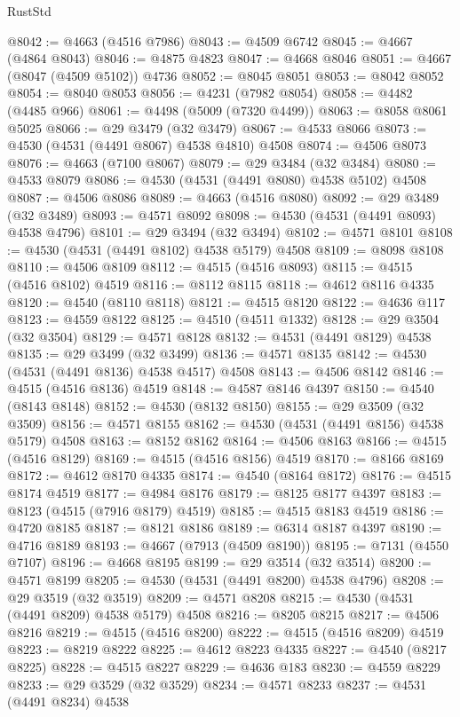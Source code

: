 \begin{lexlean}{RustStd}
\begin{coremodule}
{\begin{coremodule}
{{{{{{{{{{{{{{{{{{{{{{{{{{{{{{{{{{{{{{{{{{{{{{{{{{{{{{{@8042 := @4663 (@4516 @7986)
@8043 := @4509 @6742
@8045 := @4667 (@4864 @8043)
@8046 := @4875 @4823
@8047 := @4668 @8046
@8051 := @4667 (@8047 (@4509 @5102)) @4736
@8052 := @8045 @8051
@8053 := @8042 @8052
@8054 := @8040 @8053
@8056 := @4231 (@7982 @8054)
@8058 := @4482 (@4485 @966)
@8061 := @4498 (@5009 (@7320 @4499))
@8063 := @8058 @8061 @5025
@8066 := @29 @3479 (@32 @3479)
@8067 := @4533 @8066
@8073 := @4530 (@4531 (@4491 @8067) @4538 @4810) @4508
@8074 := @4506 @8073
@8076 := @4663 (@7100 @8067)
@8079 := @29 @3484 (@32 @3484)
@8080 := @4533 @8079
@8086 := @4530 (@4531 (@4491 @8080) @4538 @5102) @4508
@8087 := @4506 @8086
@8089 := @4663 (@4516 @8080)
@8092 := @29 @3489 (@32 @3489)
@8093 := @4571 @8092
@8098 := @4530 (@4531 (@4491 @8093) @4538 @4796)
@8101 := @29 @3494 (@32 @3494)
@8102 := @4571 @8101
@8108 := @4530 (@4531 (@4491 @8102) @4538 @5179) @4508
@8109 := @8098 @8108
@8110 := @4506 @8109
@8112 := @4515 (@4516 @8093)
@8115 := @4515 (@4516 @8102) @4519
@8116 := @8112 @8115
@8118 := @4612 @8116 @4335
@8120 := @4540 (@8110 @8118)
@8121 := @4515 @8120
@8122 := @4636 @117
@8123 := @4559 @8122
@8125 := @4510 (@4511 @1332)
@8128 := @29 @3504 (@32 @3504)
@8129 := @4571 @8128
@8132 := @4531 (@4491 @8129) @4538
@8135 := @29 @3499 (@32 @3499)
@8136 := @4571 @8135
@8142 := @4530 (@4531 (@4491 @8136) @4538 @4517) @4508
@8143 := @4506 @8142
@8146 := @4515 (@4516 @8136) @4519
@8148 := @4587 @8146 @4397
@8150 := @4540 (@8143 @8148)
@8152 := @4530 (@8132 @8150)
@8155 := @29 @3509 (@32 @3509)
@8156 := @4571 @8155
@8162 := @4530 (@4531 (@4491 @8156) @4538 @5179) @4508
@8163 := @8152 @8162
@8164 := @4506 @8163
@8166 := @4515 (@4516 @8129)
@8169 := @4515 (@4516 @8156) @4519
@8170 := @8166 @8169
@8172 := @4612 @8170 @4335
@8174 := @4540 (@8164 @8172)
@8176 := @4515 @8174 @4519
@8177 := @4984 @8176
@8179 := @8125 @8177 @4397
@8183 := @8123 (@4515 (@7916 @8179) @4519)
@8185 := @4515 @8183 @4519
@8186 := @4720 @8185
@8187 := @8121 @8186
@8189 := @6314 @8187 @4397
@8190 := @4716 @8189
@8193 := @4667 (@7913 (@4509 @8190))
@8195 := @7131 (@4550 @7107)
@8196 := @4668 @8195
@8199 := @29 @3514 (@32 @3514)
@8200 := @4571 @8199
@8205 := @4530 (@4531 (@4491 @8200) @4538 @4796)
@8208 := @29 @3519 (@32 @3519)
@8209 := @4571 @8208
@8215 := @4530 (@4531 (@4491 @8209) @4538 @5179) @4508
@8216 := @8205 @8215
@8217 := @4506 @8216
@8219 := @4515 (@4516 @8200)
@8222 := @4515 (@4516 @8209) @4519
@8223 := @8219 @8222
@8225 := @4612 @8223 @4335
@8227 := @4540 (@8217 @8225)
@8228 := @4515 @8227
@8229 := @4636 @183
@8230 := @4559 @8229
@8233 := @29 @3529 (@32 @3529)
@8234 := @4571 @8233
@8237 := @4531 (@4491 @8234) @4538
}}}}}}}}}}}}}}}}}}}}}}}}}}}}}}}}}}}}}}}}}}}}}}}}}}}}}}}
\end{coremodule}}
\end{coremodule}
\end{lexlean}

